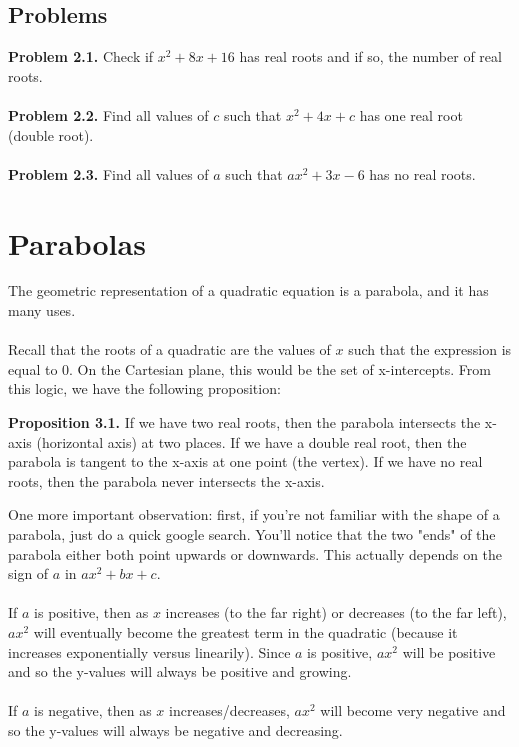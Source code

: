 \documentclass{article}
\begin{document}
\subsection{Problems}
\textbf{Problem 2.1.} Check if $x^2+8x+16$ has real roots and if so, the number of real roots.\\\\
\textbf{Problem 2.2.} Find all values of $c$ such that $x^2+4x+c$ has one real root (double root).\\\\
\textbf{Problem 2.3.} Find all values of $a$ such that $ax^2+3x-6$ has no real roots.


\section{Parabolas}
The geometric representation of a quadratic equation is a parabola, and it has many uses.\\\\
Recall that the roots of a quadratic are the values of $x$ such that the expression is equal to 0. On the Cartesian plane, this would be the set of x-intercepts. From this logic, we have the following proposition:
\begin{mdframed}
  \textbf{Proposition 3.1.} If we have two real roots, then the parabola intersects the x-axis (horizontal axis) at two places. If we have a double real root, then the parabola is tangent to the x-axis at one point (the vertex). If we have no real roots, then the parabola never intersects the x-axis.
\end{mdframed}

One more important observation: first, if you're not familiar with the shape of a parabola, just do a quick google search. You'll notice that the two "ends" of the parabola either both point upwards or downwards. This actually depends on the sign of $a$ in $ax^2+bx+c$.\\\\
If $a$ is positive, then as $x$ increases (to the far right) or decreases (to the far left), $ax^2$ will eventually become the greatest term in the quadratic (because it increases exponentially versus linearily). Since $a$ is positive, $ax^2$ will be positive and so the y-values will always be positive and growing.\\\\
If $a$ is negative, then as $x$ increases/decreases, $ax^2$ will become very negative and so the y-values will always be negative and decreasing.
\end{document}
